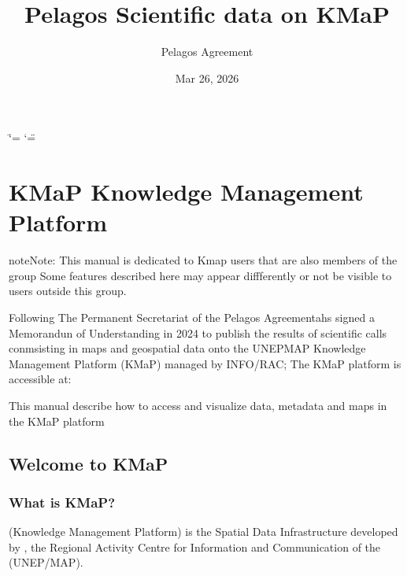 \documentclass[letterpaper,10pt,english]{sphinxmanual}
\title{Pelagos Scientific data on KMaP}
\date{Mar 26, 2026}
\author{Pelagos Agreement}
\begin{document}
\ifdefined\shorthandoff
  \ifnum\catcode`\=\string=\active\shorthandoff{=}\fi
  \ifnum\catcode`\"=\active{}\fi
\fi

\pagestyle{empty}
\sphinxmaketitle
\pagestyle{plain}
\sphinxtableofcontents
\pagestyle{normal}
\label{\detokenize{index::doc}}


\sphinxstepscope


\chapter{KMaP \textendash{} Knowledge Management Platform}
\label{\detokenize{en/index:kmap-knowledge-management-platform}}\label{\detokenize{en/index::doc}}
\sphinxAtStartPar
{}

\begin{sphinxadmonition}{note}{Note:}
\sphinxAtStartPar
This manual is dedicated to Kmap users that are also members of the  group
Some features described here may appear diffferently or not be visible to users outside
this group.
\end{sphinxadmonition}

\sphinxAtStartPar
Following The Permanent Secretariat of the Pelagos Agreementahs signed a Memorandun of Understanding in 2024
to publish the results of scientific calls conmsisting in
maps and geospatial data onto the UNEP\sphinxhyphen{}MAP Knowledge Management Platform (KMaP) managed by INFO/RAC;
The KMaP platform is accessible at: 

\sphinxAtStartPar
This manual describe how to access and visualize data, metadata and maps in the KMaP platform

\begin{figure}[htbp]
\centering

\noindent{}
\end{figure}

\sphinxstepscope


\section{Welcome to KMaP}
\label{\detokenize{en/01_welcome:welcome-to-kmap}}\label{\detokenize{en/01_welcome:welcome-en}}\label{\detokenize{en/01_welcome::doc}}

\subsection{What is KMaP?}
\label{\detokenize{en/01_welcome:what-is-kmap}}
\sphinxAtStartPar
{} (Knowledge Management Platform) is the Spatial Data Infrastructure developed by
, the Regional Activity Centre for Information and Communication of the
 (UNEP/MAP).
\end{document}

